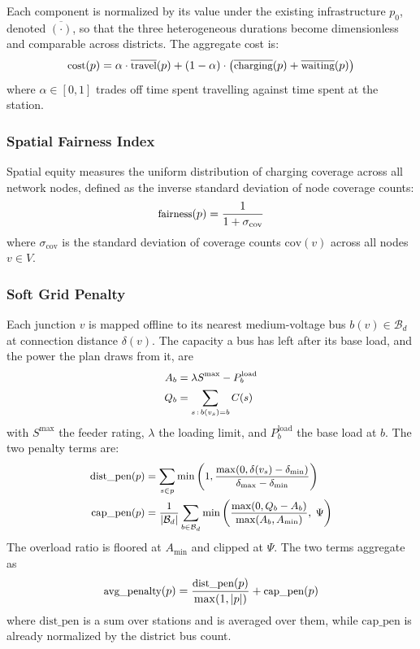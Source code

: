 \documentclass[10pt, conference, a4paper, compsocconf]{IEEEtran}
\begin{document}
Each component is normalized by its value under the existing infrastructure $p_0$, denoted $\overline{(\cdot)}$, so that the three heterogeneous durations become dimensionless and comparable across districts. The aggregate cost is:
\begin{equation}\small
\label{eq:cost}
\text{cost}(p) = \alpha \cdot \overline{\text{travel}}(p) + (1-\alpha) \cdot \big( \overline{\text{charging}}(p) + \overline{\text{waiting}}(p) \big)
\end{equation}
where $\alpha \in [0,1]$ trades off time spent travelling against time spent at the station.

\subsubsection{Spatial Fairness Index}
Spatial equity measures the uniform distribution of charging coverage across all network nodes, defined as the inverse standard deviation of node coverage counts:
\begin{equation}\small
\text{fairness}(p) = \frac{1}{1 + \sigma_{\text{cov}}}
\end{equation}
where $\sigma_{\text{cov}}$ is the standard deviation of coverage counts $\text{cov}(v)$ across all nodes $v \in V$.

\subsubsection{Soft Grid Penalty}
Each junction $v$ is mapped offline to its nearest medium-voltage bus $b(v) \in \mathcal{B}_d$ at connection distance $\delta(v)$. The capacity a bus has left after its base load, and the power the plan draws from it, are
\begin{equation}\small
\begin{aligned}
A_b &= \lambda S^{\max} - P_b^{\text{load}} \\
Q_b &= \sum_{s\,:\,b(v_s) = b} C(s)
\end{aligned}
\end{equation}
with $S^{\max}$ the feeder rating, $\lambda$ the loading limit, and $P_b^{\text{load}}$ the base load at $b$. The two penalty terms are:
\begin{equation}\small
\begin{aligned}
\text{dist\_pen}(p) &= \sum_{s \in p} \min \left( 1, \frac{\max ( 0, \delta(v_s) - \delta_{\min} )}{\delta_{\max} - \delta_{\min}} \right) \\
\text{cap\_pen}(p) &= \frac{1}{|\mathcal{B}_d|} \sum_{b \in \mathcal{B}_d} \min \left( \frac{\max(0, Q_b - A_b)}{\max(A_b, A_{\min})}, \; \Psi \right)
\end{aligned}
\end{equation}
The overload ratio is floored at $A_{\min}$ and clipped at $\Psi$. The two terms aggregate as
\begin{equation}\small
\text{avg\_penalty}(p) = \frac{\text{dist\_pen}(p)}{\max(1, |p|)} + \text{cap\_pen}(p)
\end{equation}
where $\text{dist\_pen}$ is a sum over stations and is averaged over them, while $\text{cap\_pen}$ is already normalized by the district bus count.
\end{document}
